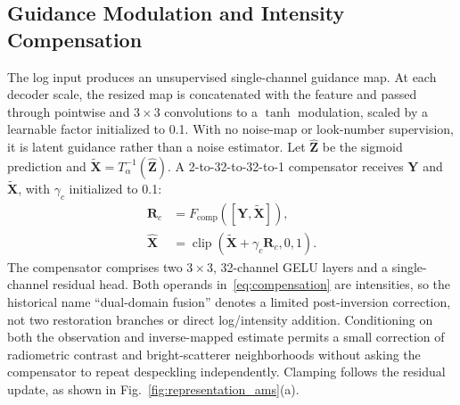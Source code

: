 \documentclass[conference]{IEEEtran}
\newcommand{\vect}[1]{\bm{#1}}
\begin{document}
\subsection{Guidance Modulation and Intensity Compensation}
The log input produces an unsupervised single-channel guidance map. At each decoder scale, the resized map is concatenated with the feature and passed through pointwise and \(3\times3\) convolutions to a \(\tanh\) modulation, scaled by a learnable factor initialized to 0.1. With no noise-map or look-number supervision, it is latent guidance rather than a noise estimator. Let \(\widehat{\vect{Z}}\) be the sigmoid prediction and \(\widetilde{\vect{X}}=T_{\alpha}^{-1}(\widehat{\vect{Z}})\). A 2-to-32-to-32-to-1 compensator receives \(\vect{Y}\) and \(\widetilde{\vect{X}}\), with \(\gamma_c\) initialized to 0.1:
\begin{equation}
\begin{aligned}
\vect{R}_{c} &= F_{\mathrm{comp}}
 ([\vect{Y},\widetilde{\vect{X}}]),\\
\widehat{\vect{X}} &= \operatorname{clip}
 (\widetilde{\vect{X}}+\gamma_c\vect{R}_{c},0,1).
\end{aligned}
\label{eq:compensation}
\end{equation}
The compensator comprises two \(3\times3\), 32-channel GELU layers and a single-channel residual head. Both operands in~\eqref{eq:compensation} are intensities, so the historical name ``dual-domain fusion'' denotes a limited post-inversion correction, not two restoration branches or direct log/intensity addition. Conditioning on both the observation and inverse-mapped estimate permits a small correction of radiometric contrast and bright-scatterer neighborhoods without asking the compensator to repeat despeckling independently. Clamping follows the residual update, as shown in Fig.~\ref{fig:representation_ams}(a).
\end{document}

